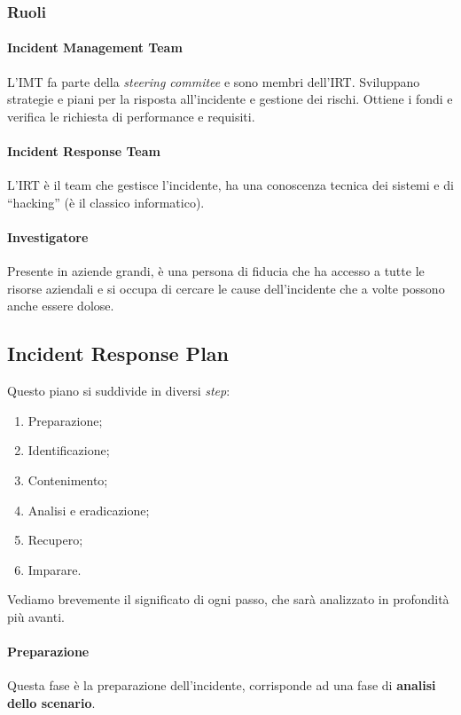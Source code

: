\subsubsection{Ruoli}

\paragraph*{Incident Management Team} L'IMT fa parte della \textit{steering commitee} 
e sono membri dell'IRT. Sviluppano strategie e piani per la risposta all'incidente e 
gestione dei rischi. Ottiene i fondi e verifica le richiesta di performance e requisiti.

\paragraph*{Incident Response Team} L'IRT è il
team che gestisce l'incidente, ha una conoscenza tecnica dei sistemi e di
``hacking'' (è il classico informatico).

\paragraph*{Investigatore} Presente in aziende grandi, è una persona di fiducia
che ha accesso a tutte le risorse aziendali e si occupa di cercare le cause
dell'incidente che a volte possono anche essere dolose.



\subsection{Incident Response Plan}

Questo piano si suddivide in diversi \textit{step}:
\begin{enumerate}
\item Preparazione;
\item Identificazione;
\item Contenimento;
\item Analisi e eradicazione;
\item Recupero;
\item Imparare.
\end{enumerate}

Vediamo brevemente il significato di ogni passo, che sarà analizzato in
profondità più avanti.

\paragraph*{Preparazione} Questa fase è la preparazione dell'incidente, corrisponde ad
una fase di \textbf{analisi dello scenario}.

